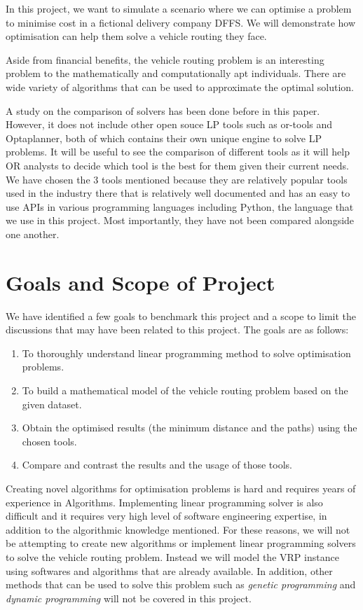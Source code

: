 In this project, we want to simulate a scenario where we can optimise
a problem to minimise cost in a fictional delivery company DFFS. We will demonstrate how optimisation can help them solve a vehicle
routing they face.

Aside from financial benefits, the vehicle routing problem is an interesting problem to the mathematically and computationally apt individuals.
There are wide variety of algorithms that can be used to approximate the optimal solution.

A study on the comparison of solvers has been done before in this paper. However, it does not include other open souce LP tools
such as or-tools and Optaplanner, both of which contains their own unique engine to solve LP problems. It will be useful to see the comparison
of different tools as it will help OR analysts to decide which tool is the best for them given their current needs. We have chosen the 3 tools mentioned
because they are relatively popular tools used in the industry there that is relatively well documented and
has an easy to use APIs in various programming languages including Python, the language that we use in this project. Most importantly, they have not
been compared alongside one another.

\section{Goals and Scope of Project}
We have identified a few goals to benchmark this project and a scope to limit the discussions that may have been related to this project. The goals are as
follows:
\begin{enumerate}
\item To thoroughly understand linear programming method to solve optimisation problems.
\item To build a mathematical model of the vehicle routing problem based on the given dataset.
\item Obtain the optimised results (the minimum distance and the paths) using the chosen tools.
\item Compare and contrast the results and the usage of those tools.
\end{enumerate}

Creating novel algorithms for optimisation problems is hard and requires years of experience in Algorithms.
Implementing linear programming solver is also difficult and it requires very high level of software engineering expertise, in addition to
the algorithmic knowledge mentioned. For these reasons, we will not be attempting to create new algorithms or implement linear programming solvers to solve
the vehicle routing problem. Instead we will model the VRP instance using softwares and algorithms that are already available.
In addition, other methods that can be used to solve this problem such as \textit{genetic programming} and \textit{dynamic programming} will
not be covered in this project.

